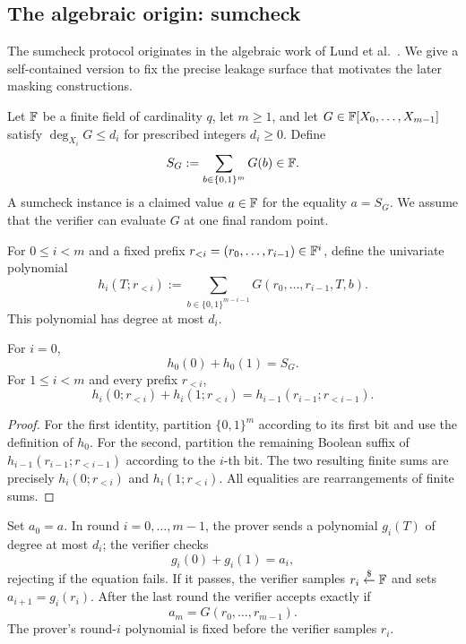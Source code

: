 \subsection{The algebraic origin: sumcheck}\label{sec:history:sumcheck}

The sumcheck protocol originates in the algebraic work of Lund et al.~\cite{LFKN1992}. We give a self-contained version to fix the precise leakage surface that motivates the later masking constructions.

\begin{definition}\label{def:history:sumcheck}
Let $\mathbb{F}$ be a finite field of cardinality $q$, let $m\geq 1$, and let
$G\in\mathbb{F}[X_0,\ldots,X_{m-1}]$ satisfy
$\deg_{X_i}G\leq d_i$ for prescribed integers $d_i\geq0$.
Define
\[
  S_G:=\sum_{b\in\{0,1\}^{m}}G(b)\in\mathbb{F}.
\]
A sumcheck instance is a claimed value $a\in\mathbb{F}$ for the equality $a=S_G$.
We assume that the verifier can evaluate $G$ at one final random point.
\end{definition}

\begin{definition}\label{def:history:partial}
For $0\leq i<m$ and a fixed prefix $r_{<i}=(r_0,\ldots,r_{i-1})\in\mathbb{F}^i$,
define the univariate polynomial
\[
 h_i(T;r_{<i})
 :=\sum_{b\in\{0,1\}^{m-i-1}}
 G(r_0,\ldots,r_{i-1},T,b).
\]
This polynomial has degree at most $d_i$.
\end{definition}

\begin{lemma}\label{lem:history:telescoping}
For $i=0$,
\[
 h_0(0)+h_0(1)=S_G.
\]
For $1\leq i<m$ and every prefix $r_{<i}$,
\[
 h_i(0;r_{<i})+h_i(1;r_{<i})
 =h_{i-1}(r_{i-1};r_{<i-1}).
\]
\end{lemma}
\begin{proof}
For the first identity, partition $\{0,1\}^m$ according to its first bit and use the definition of $h_0$. For the second, partition the remaining Boolean suffix of $h_{i-1}(r_{i-1};r_{<i-1})$ according to the $i$-th bit. The two resulting finite sums are precisely $h_i(0;r_{<i})$ and $h_i(1;r_{<i})$. All equalities are rearrangements of finite sums.
\end{proof}

\begin{definition}\label{def:history:verifier}
Set $a_0=a$. In round $i=0,\ldots,m-1$, the prover sends a polynomial $g_i(T)$ of degree at most $d_i$; the verifier checks
\[
  g_i(0)+g_i(1)=a_i,
\]
rejecting if the equation fails. If it passes, the verifier samples
$r_i\overset{\$}{\leftarrow}\mathbb{F}$ and sets $a_{i+1}=g_i(r_i)$.
After the last round the verifier accepts exactly if
\[
  a_m=G(r_0,\ldots,r_{m-1}).
\]
The prover's round-$i$ polynomial is fixed before the verifier samples $r_i$.
\end{definition}

